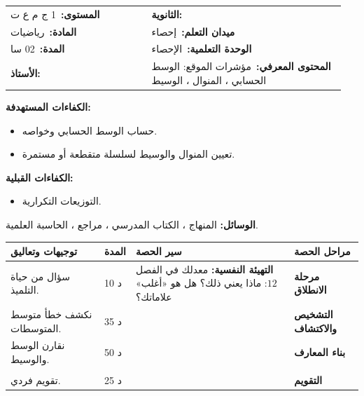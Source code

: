 \documentclass[12pt,a4paper]{article}
\makeatletter
\newenvironment{LTR}{\begin{otherlanguage}{english}}{\end{otherlanguage}}
\newcommand{\ar}[1]{\foreignlanguage{arabic}{#1}}
\newcommand{\Phase}[1]{\textbf{#1}}
\newcommand{\Fld}[2]{\textbf{#1:}\ #2}
\newcommand{\ModhHead}[9]{%
\begin{LTR}
\begin{tcolorbox}[enhanced,colback=white,colframe=cThm!85!black,arc=4mm,boxrule=1pt,top=14pt,bottom=6pt,left=8pt,right=8pt,
 overlay={\node[fill=cThm!85!black,text=white,rounded corners=3mm,inner xsep=14pt,inner ysep=4pt,font=\large\bfseries] at ([yshift=0pt]frame.north){\ar{مذكرة رقم #1}};},
 before upper={\selectlanguage{arabic}}]
\begin{tabular}{@{}p{0.4\linewidth}p{0.55\linewidth}@{}}
\Fld{المستوى}{#2} & \Fld{الثانوية}{\dotfill}\\[3pt]
\Fld{المادة}{رياضيات} & \Fld{ميدان التعلم}{#3}\\[3pt]
\Fld{المدة}{#5} & \Fld{الوحدة التعلمية}{#4}\\[3pt]
\Fld{الأستاذ}{\dotfill} & \Fld{المحتوى المعرفي}{#6}\\
\end{tabular}
\end{tcolorbox}
\begin{tcolorbox}[enhanced,colback=white,colframe=cThm!85!black,arc=3mm,boxrule=0.8pt,sidebyside,sidebyside align=top,lefthand ratio=0.5,
 segmentation style={dashed,cThm!60},before upper={\selectlanguage{arabic}},before lower={\selectlanguage{arabic}}]
\textbf{الكفاءات المستهدفة:}\par #8
\tcblower
\textbf{الكفاءات القبلية:}\par #7
\end{tcolorbox}
\end{LTR}
\par\smallskip\textbf{الوسائل:} #9\par\smallskip}
\newenvironment{Sayr}{%
\begin{LTR}\renewcommand{\arraystretch}{1.25}
\begin{longtable}{|p{0.17\textwidth}|>{\centering\arraybackslash}p{0.06\textwidth}|p{0.53\textwidth}|>{\centering\arraybackslash}p{0.12\textwidth}|}
\hline\rowcolor{cThm!12}\ar{\textbf{توجيهات وتعاليق}} & \ar{\textbf{المدة}} & \ar{\textbf{سير الحصة}} & \ar{\textbf{مراحل الحصة}}\\\hline\endhead
\hline\endfoot}{\end{longtable}\end{LTR}}
\newcommand{\Row}[4]{\ar{\small #4} & \ar{#3} & \ar{#2} & \cellcolor{cThm!8}\ar{\Phase{#1}}\\\hline}
\newcommand{\Lab}[2]{\foreignlanguage{english}{\tcbox[on line,colback=#1,colframe=#1,boxrule=0pt,arc=2pt,boxsep=1pt,left=5pt,right=5pt,top=1pt,bottom=1pt]{\ar{\textcolor{white}{\textbf{#2}}}}}}
\newcommand{\ck}{\ensuremath{{\color{cRem}\checkmark}}}
\makeatother
\begin{document}
\newpage
\ModhHead{50}{1 ج م ع ت}{إحصاء}{الإحصاء}{02 سا}{مؤشرات الموقع: الوسط الحسابي ، المنوال ، الوسيط}%
{\begin{itemize}\item التوزيعات التكرارية.\end{itemize}}%
{\begin{itemize}\item حساب الوسط الحسابي وخواصه.\item تعيين المنوال والوسيط لسلسلة متقطعة أو مستمرة.\end{itemize}}%
{المنهاج ، الكتاب المدرسي ، مراجع ، الحاسبة العلمية.}
\begin{Sayr}
\Row{مرحلة الانطلاق}{%
\textbf{التهيئة النفسية:} معدلك في الفصل $12$: ماذا يعني ذلك؟ هل هو «أغلب» علاماتك؟}{10 د}{سؤال من حياة التلميذ.}
\Row{التشخيص والاكتشاف}{%
\Lab{cEx}{مناقشة النشاطين 04 و 05 صفحة 140}\par\ck\ فوج من $20$ تلميذاً معدلهم $9$ وفوج من $10$ تلاميذ معدلهم $12$: المعدل العام $\dfrac{20\times9+10\times12}{30}=10$ وليس $\dfrac{9+12}2$.\par
\ck\ نحسب الوسط الحسابي بالتواترات: $\bar x=\sum f_ix_i$.\par
}{35 د}{نكشف خطأ متوسط المتوسطات.}
\Row{بناء المعارف}{%
\Lab{cDef}{تعريف}\par\ck\ \textbf{الوسط الحسابي:} $\bar x=\dfrac{\sum n_ix_i}{N}=\sum f_ix_i$ (لسلسلة مستمرة نستعمل مراكز الفئات).\par
\ck\ \textbf{المنوال:} القيمة (أو الفئة) ذات أكبر تكرار.\par
\ck\ \textbf{الوسيط} $Me$: القيمة التي تقسم السلسلة المرتبة إلى قسمين لهما نفس العدد من القيم.\par
\Lab{cThm}{خطية الوسط}\ إذا كان $y_i=ax_i+b$ فإن $\bar y=a\bar x+b$.\par}{50 د}{نقارن الوسط والوسيط.}
\Row{}{%
\Lab{cEx}{مثال}\par\ck\ سلسلة العلامات (المذكرة 48): $\bar x=\dfrac{300}{30}=10$ ؛ المنوال $10$ ؛ $N=30$ والقيمتان $15$ و $16$ في الترتيب تساويان $10$ ، إذن $Me=10$.\par
\ck\ المكالمات: مراكز الفئات $10$ ، $30$ ، $50$ ، $70$: $\bar t=\dfrac{1800}{40}=45$ s ؛ الوسيط في الفئة $[40;60[$: $Me\approx40+\dfrac{20-15}{15}\times20\approx46{,}7$ s.\par
\Lab{cThm!80!black}{حذار}\ الوسط الحسابي يتأثر بالقيم المتطرفة ، والوسيط لا يتأثر بها.}{}{}
\Row{التقويم}{%
\Lab{cEx}{تطبيق}\par أضاف الأستاذ نقطة لكل تلميذ ثم ضرب العلامات في $1{,}5$. ما الوسط الجديد إذا كان القديم $10$ ؟\par\textbf{الحل:} $(10+1)\times1{,}5=16{,}5$.\par\textbf{واجب منزلي:} تمارين من الكتاب المدرسي.\par\smallskip\textbf{ملاحظات حول سير الحصة:} \dotfill}{25 د}{تقويم فردي.}
\end{Sayr}
\end{document}
